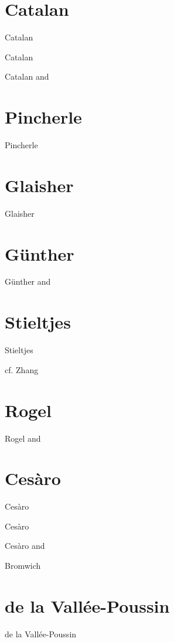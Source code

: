 \documentclass{article}
\begin{document}
\section{Catalan}
Catalan \cite{catalan1842}

Catalan \cite[p.~89]{catalan1873}

Catalan \cite[p.~119, \S CXXIV]{melanges1886} and \cite[pp.~38--39, \S CCXXVI]{melanges1888}




\section{Pincherle}
Pincherle \cite{pincherle}







\section{Glaisher}
Glaisher \cite[p.~163]{glaisher}

\section{G\"unther}
G\"unther \cite[p.~83]{gunther} and \cite[p.~178]{gunther1881}

\section{Stieltjes}
Stieltjes \cite{stieltjes}

cf. Zhang \cite{zhang}

\section{Rogel}
Rogel \cite{rogel} and \cite{rogel1891}


\section{Ces\`aro}
Ces\`aro \cite{cesaro1886}

Ces\`aro \cite{cesaro1888}




Ces\`aro \cite{cesaro1893} and \cite[pp.~181--184]{cesaro1894}



Bromwich \cite[p.~201, Chapter VIII, Example B, 35]{bromwich}


\section{de la Vall\'ee-Poussin}
de la Vall\'ee-Poussin \cite{valleepoussin}
\end{document}
